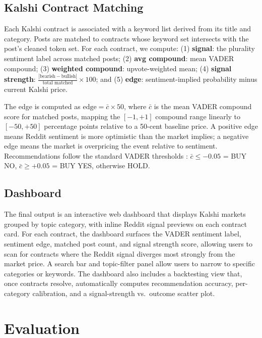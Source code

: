 \documentclass[sigconf]{acmart}
\begin{document}
\subsection{Kalshi Contract Matching}

Each Kalshi contract is associated with a keyword list derived from its title and category. Posts are matched to contracts whose keyword set intersects with the post's cleaned token set. For each contract, we compute: (1) \textbf{signal}: the plurality sentiment label across matched posts; (2) \textbf{avg compound}: mean VADER compound; (3) \textbf{weighted compound}: upvote-weighted mean; (4) \textbf{signal strength}: $\frac{|\text{bearish} - \text{bullish}|}{\text{total matched}} \times 100$; and (5) \textbf{edge}: sentiment-implied probability minus current Kalshi price.

The edge is computed as $\text{edge} = \bar{c} \times 50$, where $\bar{c}$ is the mean VADER compound score for matched posts, mapping the $[-1,+1]$ compound range linearly to $[-50,+50]$ percentage points relative to a 50-cent baseline price. A positive edge means Reddit sentiment is more optimistic than the market implies; a negative edge means the market is overpricing the event relative to sentiment. Recommendations follow the standard VADER thresholds \cite{hutto2014vader}: $\bar{c} \leq -0.05$ = BUY NO, $\bar{c} \geq +0.05$ = BUY YES, otherwise HOLD.

\subsection{Dashboard}

The final output is an interactive web dashboard that displays Kalshi markets grouped by topic category, with inline Reddit signal previews on each contract card. For each contract, the dashboard surfaces the VADER sentiment label, sentiment edge, matched post count, and signal strength score, allowing users to scan for contracts where the Reddit signal diverges most strongly from the market price. A search bar and topic-filter panel allow users to narrow to specific categories or keywords. The dashboard also includes a backtesting view that, once contracts resolve, automatically computes recommendation accuracy, per-category calibration, and a signal-strength vs.\ outcome scatter plot.

\section{Evaluation}
\end{document}
